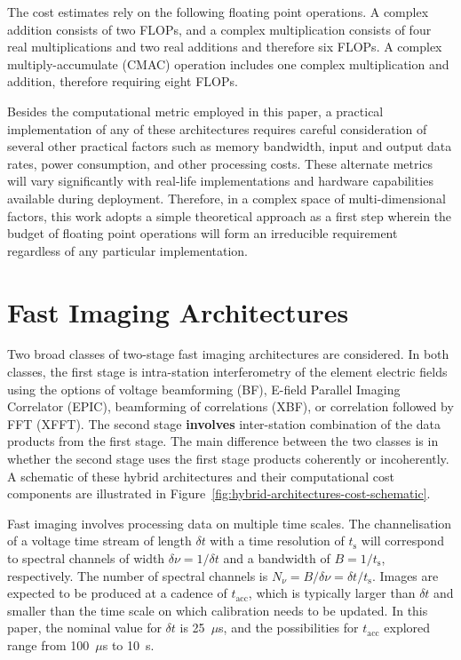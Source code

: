 \documentclass[
  journal=pasa,
  manuscript=article-type,
  year=2020,
  volume=37,
]{cup-journal}
\begin{document}
The cost estimates rely on the following floating point operations. A complex addition consists of two FLOPs, and a complex multiplication consists of four real multiplications and two real additions and therefore six FLOPs. A complex multiply-accumulate (CMAC) operation includes one complex multiplication and addition, therefore requiring eight FLOPs.

Besides the computational metric employed in this paper, a practical implementation of any of these architectures requires careful consideration of several other practical factors such as memory bandwidth, input and output data rates, power consumption, and other processing costs. These alternate metrics will vary significantly with real-life implementations and hardware capabilities available during deployment. Therefore, in a complex space of multi-dimensional factors, this work adopts a simple theoretical approach as a first step wherein the budget of floating point operations will form an irreducible requirement regardless of any particular implementation. 

\section{Fast Imaging Architectures} \label{sec:img-archs}

Two broad classes of two-stage fast imaging architectures are considered. In both classes, the first stage is intra-station interferometry of the element electric fields using the options of voltage beamforming (BF), E-field Parallel Imaging Correlator (EPIC), beamforming of correlations (XBF), or correlation followed by FFT (XFFT). The second stage \textbf{involves} inter-station combination of the data products from the first stage. The main difference between the two classes is in whether the second stage uses the first stage products coherently or incoherently. A schematic of these hybrid architectures and their computational cost components are illustrated in Figure~\ref{fig:hybrid-architectures-cost-schematic}.

Fast imaging involves processing data on multiple time scales. The channelisation of a voltage time stream of length $\delta t$ with a time resolution of $t_\textrm{s}$ will correspond to spectral channels of width $\delta\nu=1/\delta t$ and a bandwidth of $B=1/t_\textrm{s}$, respectively. The number of spectral channels is $N_\nu=B/\delta\nu=\delta t/t_\textrm{s}$. Images are expected to be produced at a cadence of $t_\textrm{acc}$, which is typically larger than $\delta t$ and smaller than the time scale on which calibration needs to be updated. In this paper, the nominal value for $\delta t$ is 25~$\mu$s, and the possibilities for $t_\textrm{acc}$ explored range from 100~$\mu$s to 10~s. 
\end{document}
